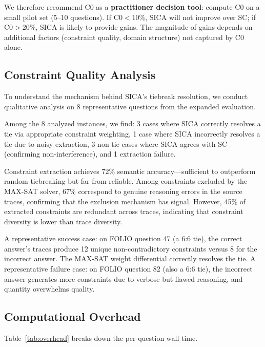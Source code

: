 \documentclass[11pt,a4paper]{article}
\begin{document}
We therefore recommend C0 as a \textbf{practitioner decision tool}: compute C0 on a small pilot set (5--10 questions). If C0$<$10\%, SICA will not improve over SC; if C0$>$20\%, SICA is likely to provide gains. The magnitude of gains depends on additional factors (constraint quality, domain structure) not captured by C0 alone.

\subsection{Constraint Quality Analysis}
\label{sec:constraint_quality}

To understand the mechanism behind SICA's tiebreak resolution, we conduct qualitative analysis on 8 representative questions from the expanded evaluation.

Among the 8 analyzed instances, we find: 3 cases where SICA correctly resolves a tie via appropriate constraint weighting, 1 case where SICA incorrectly resolves a tie due to noisy extraction, 3 non-tie cases where SICA agrees with SC (confirming non-interference), and 1 extraction failure.

Constraint extraction achieves 72\% semantic accuracy---sufficient to outperform random tiebreaking but far from reliable. Among constraints excluded by the MAX-SAT solver, 67\% correspond to genuine reasoning errors in the source traces, confirming that the exclusion mechanism has signal. However, 45\% of extracted constraints are redundant across traces, indicating that constraint diversity is lower than trace diversity.

A representative success case: on FOLIO question 47 (a 6:6 tie), the correct answer's traces produce 12 unique non-contradictory constraints versus 8 for the incorrect answer. The MAX-SAT weight differential correctly resolves the tie. A representative failure case: on FOLIO question 82 (also a 6:6 tie), the incorrect answer generates more constraints due to verbose but flawed reasoning, and quantity overwhelms quality.

\subsection{Computational Overhead}
\label{sec:overhead}

Table~\ref{tab:overhead} breaks down the per-question wall time.
\end{document}
